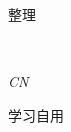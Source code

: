 \begin{titlepage}
	
	整理
	
	\vspace{0.5\baselineskip} %
	
	{\scshape\Large \@author \\} %
	
	\vspace{0.5\baselineskip} %
	
	\textit{CN} %
	
	\vfill %
	
    \makeatletter

	
    \newcommand{\plogo}{} %

	\plogo %
	
	\vspace{0.3\baselineskip} %
	
	\BookYear %

	{\large 学习自用} %

\end{titlepage}
